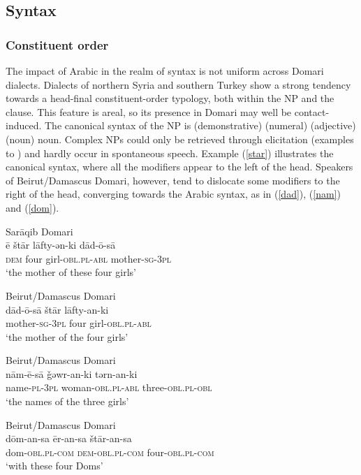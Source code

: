 \documentclass[output=paper]{langsci/langscibook}
\begin{document}
 
 \subsection{Syntax}
 \subsubsection{Constituent order}

The impact of Arabic in the realm of syntax is not uniform across Domari dialects. Dialects of northern Syria and southern Turkey show a strong tendency towards a head-final constituent-order typology, both within the NP and the clause. This feature is areal, so its presence in Domari may well be contact-induced. The canonical syntax of the NP is (demonstrative) (numeral) (adjective) (noun) noun. Complex NPs could only be retrieved through elicitation (examples  to ) and hardly occur in spontaneous speech. Example (\ref{star}) illustrates the canonical syntax, where all the modifiers appear to the left of the head. Speakers of Beirut/Damascus Domari, however, tend to dislocate some modifiers to the right of the head, converging towards the Arabic syntax, as in (\ref{dad}), (\ref{nam}) and (\ref{dom}).

\ea
{Sarāqib Domari}\\ \label{star}
\gll ē štār lāfty-ən-ki dād-ō-sā\\
     \textsc{dem} four girl-\textsc{obl.pl-abl} mother-\textsc{sg-3pl}\\
\glt ‘the mother of these four girls’
\z

\ea\label{ex:key:} \label{dad}
{Beirut/Damascus Domari}\\
\gll dād-ō-sā štār lāfty-an-ki\\
     mother-\textsc{sg-3pl} four girl-\textsc{obl.pl-abl}\\
\glt ‘the mother of the four girls’
\z

\ea\label{ex:key:} \label{nam}
{Beirut/Damascus Domari}\\
\gll nām-ē-sā \v{g}əwr-an-ki tərn-an-ki\\
     name-\textsc{pl-3pl} woman-\textsc{obl.pl-abl} three-\textsc{obl.pl-obl}\\
\glt ‘the names of the three girls’
\z

\ea\label{ex:key:} \label{dom}
{Beirut/Damascus Domari}\\
\gll dōm-an-sa ēr-an-sa štār-an-sa\\
     dom-\textsc{obl.pl-com} \textsc{dem-obl.pl-com} four-\textsc{obl.pl-com}\\
\glt ‘with these four Doms’
\z
\end{document}
